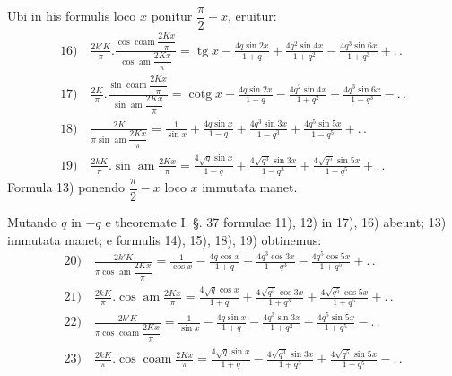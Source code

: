 \documentclass{article}
\begin{document}
Ubi in his formulis loco $x$ ponitur $\dfrac{\pi}{2}-x$, eruitur:
\[
\begin{gathered}
\text{16)}\quad\frac{2k'K}{\pi}.\frac{\cos\operatorname{coam}\dfrac{2Kx}{\pi}}{\cos\operatorname{am}\dfrac{2Kx}{\pi}}=\operatorname{tg}x-\frac{4q\sin2x}{1+q}+\frac{4q^{2}\sin4x}{1+q^{2}}-\frac{4q^{3}\sin6x}{1+q^{3}}+.\,.\\[2ex]
\text{17)}\quad\frac{2K}{\pi}.\frac{\sin\operatorname{coam}\dfrac{2Kx}{\pi}}{\sin\operatorname{am}\dfrac{2Kx}{\pi}}=\operatorname{cotg}x+\frac{4q\sin2x}{1-q}-\frac{4q^{2}\sin4x}{1+q^{2}}+\frac{4q^{3}\sin6x}{1-q^{3}}-.\,.\\[2ex]
\text{18)}\quad\frac{2K}{\pi\sin\operatorname{am}\dfrac{2Kx}{\pi}}=\frac{1}{\sin x}+\frac{4q\sin x}{1-q}+\frac{4q^{3}\sin3x}{1-q^{3}}+\frac{4q^{5}\sin5x}{1-q^{5}}+.\,.\\[2ex]
\text{19)}\quad\frac{2kK}{\pi}.\sin\operatorname{am}\frac{2Kx}{\pi}=\frac{4\sqrt{q}\sin x}{1-q}+\frac{4\sqrt{q^{3}}\sin3x}{1-q^{3}}+\frac{4\sqrt{q^{5}}\sin5x}{1-q^{5}}+.\,.
\end{gathered}
\]
Formula 13) ponendo $\dfrac{\pi}{2}-x$ loco $x$ immutata manet.

Mutando $q$ in $-q$ e theoremate I. §. 37 formulae 11), 12) in 17), 16) abeunt; 13) immutata manet; e formulis 14), 15), 18), 19) obtinemus:
\[
\begin{gathered}
\text{20)}\quad\frac{2k'K}{\pi\cos\operatorname{am}\dfrac{2Kx}{\pi}}=\frac{1}{\cos x}-\frac{4q\cos x}{1+q}+\frac{4q^{3}\cos3x}{1-q^{3}}-\frac{4q^{5}\cos5x}{1+q^{5}}+.\,.\\[2ex]
\text{21)}\quad\frac{2kK}{\pi}.\cos\operatorname{am}\frac{2Kx}{\pi}=\frac{4\sqrt{q}\cos x}{1+q}+\frac{4\sqrt{q^{3}}\cos3x}{1+q^{3}}+\frac{4\sqrt{q^{5}}\cos5x}{1+q^{5}}+.\,.\\[2ex]
\text{22)}\quad\frac{2k'K}{\pi\cos\operatorname{coam}\dfrac{2Kx}{\pi}}=\frac{1}{\sin x}-\frac{4q\sin x}{1+q}-\frac{4q^{3}\sin3x}{1+q^{3}}-\frac{4q^{5}\sin5x}{1+q^{5}}-.\,.\\[2ex]
\text{23)}\quad\frac{2kK}{\pi}.\cos\operatorname{coam}\frac{2Kx}{\pi}=\frac{4\sqrt{q}\sin x}{1+q}-\frac{4\sqrt{q^{3}}\sin3x}{1+q^{3}}+\frac{4\sqrt{q^{5}}\sin5x}{1+q^{5}}-.\,.
\end{gathered}
\]

\end{document}
